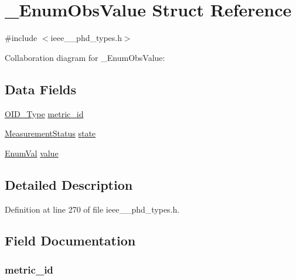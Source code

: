 \hypertarget{struct___enum_obs_value}{}\section{\+\_\+\+Enum\+Obs\+Value Struct Reference}
\label{struct___enum_obs_value}


{\ttfamily \#include $<$ieee\+\_\+\_\+phd\+\_\+types.\+h$>$}



Collaboration diagram for \+\_\+\+Enum\+Obs\+Value\+:
\subsection*{Data Fields}
\begin{DoxyCompactItemize}
\item 
\hyperlink{ieee__11073__phd__types_8h_aa4d7af235d4a95d6632aa0d64160dd62}{O\+I\+D\+\_\+\+Type} \hyperlink{struct___enum_obs_value_ad9122266e1be3ec211d15c7f3615cca7}{metric\+\_\+id}
\item 
\hyperlink{ieee__11073__phd__types_8h_a23659054d19145982be64810157706df}{Measurement\+Status} \hyperlink{struct___enum_obs_value_a13d01c3f9f21fd12a22772c0e1b7d88b}{state}
\item 
\hyperlink{ieee__11073__phd__types_8h_a125d1b53e2224d628865ae054006253c}{Enum\+Val} \hyperlink{struct___enum_obs_value_a17a0b71604d0c12551d17fc067dc361c}{value}
\end{DoxyCompactItemize}


\subsection{Detailed Description}


Definition at line 270 of file ieee\+\_\+\_\+phd\+\_\+types.\+h.



\subsection{Field Documentation}
\hypertarget{struct___enum_obs_value_ad9122266e1be3ec211d15c7f3615cca7}{}
\subsubsection[{metric\+\_\+id}]{ metric\+\_\+id}\label{struct___enum_obs_value_ad9122266e1be3ec211d15c7f3615cca7}


